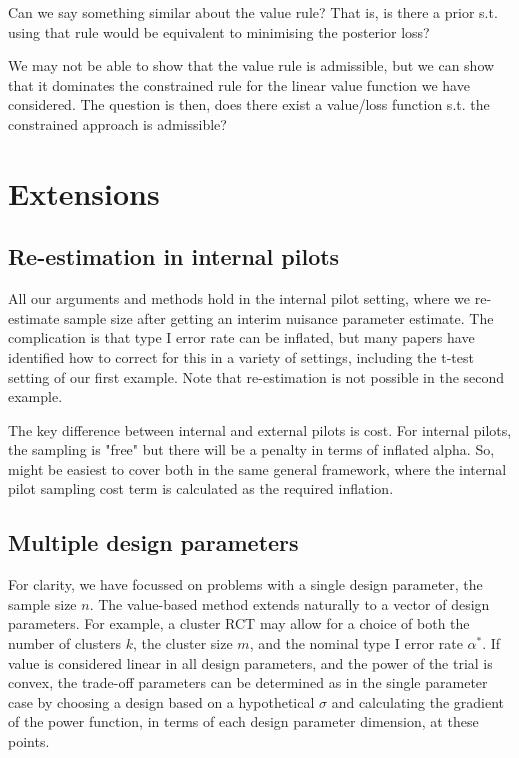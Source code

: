 \documentclass[sagev, Crown]{sagej}
\begin{document}
Can we say something similar about the value rule? That is, is there a prior s.t. using that rule would be equivalent to minimising the posterior loss?

We may not be able to show that the value rule is admissible, but we can show that it dominates the constrained rule for the linear value function we have considered. The question is then, does there exist a value/loss function s.t. the constrained approach is admissible? 

\section{Extensions}\label{sec:extensions}

\subsection{Re-estimation in internal pilots}

All our arguments and methods hold in the internal pilot setting, where we re-estimate sample size after getting an interim nuisance parameter estimate. The complication is that type I error rate can be inflated, but many papers have identified how to correct for this in a variety of settings, including the t-test setting of our first example. Note that re-estimation is not possible in the second example.

The key difference between internal and external pilots is cost. For internal pilots, the sampling is "free" but there will be a penalty in terms of inflated alpha. So, might be easiest to cover both in the same general framework, where the internal pilot sampling cost term is calculated as the required inflation.

\subsection{Multiple design parameters}

For clarity, we have focussed on problems with a single design parameter, the sample size $n$. The value-based method extends naturally to a vector of design parameters. For example, a cluster RCT may allow for a choice of both the number of clusters $k$, the cluster size $m$, and the nominal type I error rate $\alpha^*$. If value is considered linear in all design parameters, and the power of the trial is convex, the trade-off parameters can be determined as in the single parameter case by choosing a design based on a hypothetical $\sigma$ and calculating the gradient of the power function, in terms of each design parameter dimension, at these points.
\end{document}
